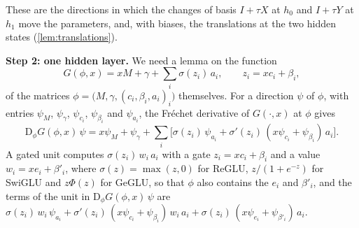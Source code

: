 \documentclass[10pt]{article}
\theoremstyle{definition}
\theoremstyle{remark}
\newcommand{\Der}{\mathrm{D}}
\newcommand{\para}[1]{\smallskip\noindent\textbf{#1}\hspace{0.5em}}
\begin{document}
These are the directions in which the changes of basis $I + \tau X$ at $h_0$ and $I + \tau Y$ at $h_1$ move the parameters, and, with biases, the translations at the two hidden states (\cref{lem:translations}).

\para{Step 2: one hidden layer.} We need a lemma on the function
\[
G(\phi, x) = xM + \gamma + \textstyle\sum_i \sigma(z_i)\,a_i,\qquad z_i = xc_i + \beta_i,
\]
of the matrices $\phi = \big(M, \gamma, (c_i, \beta_i, a_i)_i\big)$ themselves. For a direction $\psi$ of $\phi$, with entries $\psi_M$, $\psi_\gamma$, $\psi_{c_i}$, $\psi_{\beta_i}$ and $\psi_{a_i}$, the Fr\'echet derivative of $G(\cdot, x)$ at $\phi$ gives
\begin{equation}\label{eq:dotF}
\Der_\phi G(\phi, x)\,\psi = x\psi_M + \psi_\gamma + \sum_i \big[\sigma(z_i)\,\psi_{a_i} + \sigma'(z_i)\,(x\psi_{c_i} + \psi_{\beta_i})\,a_i\big].
\end{equation}
A gated unit computes $\sigma(z_i)\,w_i\,a_i$ with a gate $z_i = xc_i + \beta_i$ and a value $w_i = xe_i + \beta'_i$, where $\sigma(z) = \max(z, 0)$ for ReGLU, $z/(1 + e^{-z})$ for SwiGLU and $z\Phi(z)$ for GeGLU, so that $\phi$ also contains the $e_i$ and $\beta'_i$, and the terms of the unit in $\Der_\phi G(\phi, x)\,\psi$ are $\sigma(z_i)\,w_i\,\psi_{a_i} + \sigma'(z_i)\,(x\psi_{c_i} + \psi_{\beta_i})\,w_i\,a_i + \sigma(z_i)\,(x\psi_{e_i} + \psi_{\beta'_i})\,a_i$.
\end{document}
